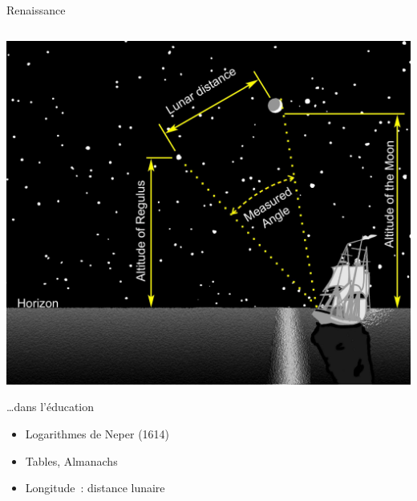 \begin{frame}{Renaissance}
\begin{columns}
\begin{column}{0.49\linewidth}
	\begin{centering}
	\includegraphics[height=0.4\paperheight]{../resources/illustrations/lunar-distance} \\
	\end{centering}
\ldots dans l'éducation
\begin{itemize}
\item Logarithmes de Neper (1614)
\item Tables, Almanachs
\item Longitude~: distance lunaire
\end{itemize}
\end{column}


\end{columns}
\end{frame}
